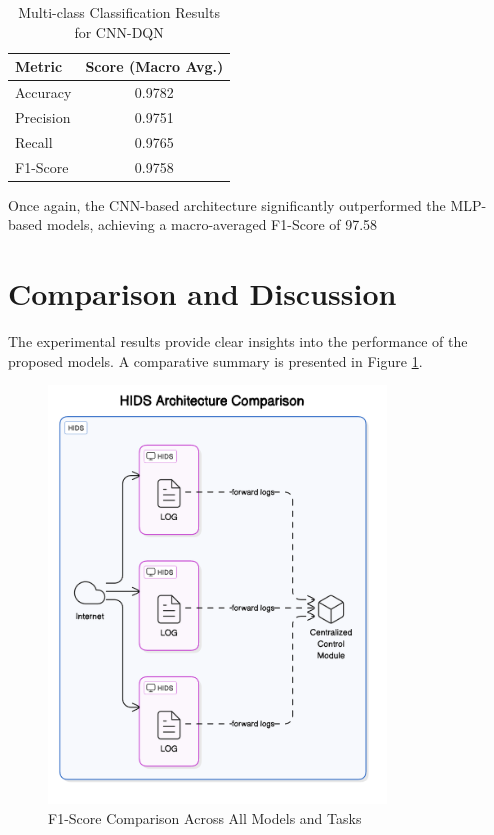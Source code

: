 \documentclass{report}
\begin{document}
\begin{table}[H]
    \centering
    \caption{Multi-class Classification Results for CNN-DQN}
    \label{tab:multi_cnn_dqn_results}
    \begin{tabular}{@{}lc@{}}
        \toprule
        \textbf{Metric} & \textbf{Score (Macro Avg.)} \\
        \midrule
        Accuracy & 0.9782 \\
        Precision & 0.9751 \\
        Recall & 0.9765 \\
        F1-Score & 0.9758 \\
        \bottomrule
    \end{tabular}
\end{table}

Once again, the CNN-based architecture significantly outperformed the MLP-based models, achieving a macro-averaged F1-Score of 97.58%

\section{Comparison and Discussion}
The experimental results provide clear insights into the performance of the proposed models. A comparative summary is presented in Figure \ref{fig:f1_comparison}.

\begin{figure}[H]
    \centering
    \includegraphics[width=0.8\textwidth]{images/hids-diagram.png} %
    \caption{F1-Score Comparison Across All Models and Tasks}
    \label{fig:f1_comparison}
\end{figure}
\end{document}
